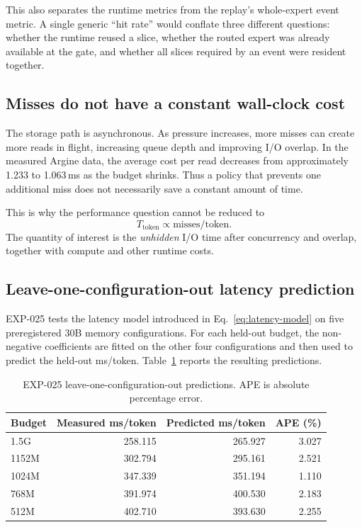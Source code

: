 This also separates the runtime metrics from the replay's whole-expert event metric. A single generic ``hit rate'' would conflate three different questions: whether the runtime reused a slice, whether the routed expert was already available at the gate, and whether all slices required by an event were resident together.

\subsection{Misses do not have a constant wall-clock cost}

The storage path is asynchronous. As pressure increases, more misses can create more reads in flight, increasing queue depth and improving I/O overlap. In the measured Argine data, the average cost per read decreases from approximately 1.233 to 1.063\,ms as the budget shrinks. Thus a policy that prevents one additional miss does not necessarily save a constant amount of time.

This is why the performance question cannot be reduced to
\[
    T_{\mathrm{token}}
    \propto
    \text{misses/token}.
\]
The quantity of interest is the \emph{unhidden} I/O time after concurrency and overlap, together with compute and other runtime costs.

\subsection{Leave-one-configuration-out latency prediction}

EXP-025 tests the latency model introduced in Eq.~\eqref{eq:latency-model} on five preregistered 30B memory configurations. For each held-out budget, the non-negative coefficients are fitted on the other four configurations and then used to predict the held-out ms/token. Table~\ref{tab:loo-predictions} reports the resulting predictions.

\begin{table}[t]
    \centering
    \caption{EXP-025 leave-one-configuration-out predictions. APE is absolute percentage error.}
    \label{tab:loo-predictions}
    \small
    \begin{tabular}{lrrr}
        \toprule
        Budget & Measured ms/token & Predicted ms/token & APE (\%) \\
        \midrule
        1.5G  & 258.115 & 265.927 & 3.027 \\
        1152M & 302.794 & 295.161 & 2.521 \\
        1024M & 347.339 & 351.194 & 1.110 \\
        768M  & 391.974 & 400.530 & 2.183 \\
        512M  & 402.710 & 393.630 & 2.255 \\
        \bottomrule
    \end{tabular}
\end{table}

